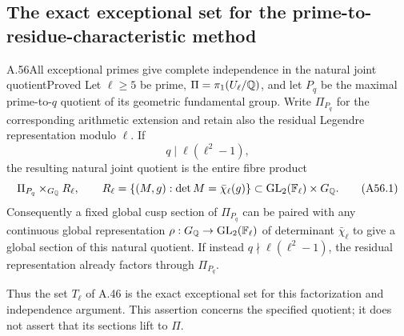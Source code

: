 \subsection{The exact exceptional set for the prime-to-residue-characteristic method}

\begin{statement}{A.56}{All exceptional primes give complete independence in the natural joint quotient}{Proved}
Let $\ell\ge5$ be prime, $\Pi=\pi_1(U_\ell/\mathbb Q)$, and let $P_q$ be
the maximal prime-to-$q$ quotient of its geometric fundamental group.
Write $\Pi_{P_q}$ for the corresponding arithmetic extension and retain
also the residual Legendre representation modulo $\ell$. If
\[
 q\mid\ell(\ell^2-1),
\]
the resulting natural joint quotient is the entire fibre product
\[
 \Pi_{P_q}\mathbin{\times}_{G_\mathbb Q} R_\ell,
 \qquad
 R_\ell=\{(M,g):\det M=\bar\chi_\ell(g)\}
       \subset\mathrm{GL}_2(\mathbb F_\ell)\times G_\mathbb Q.
 \tag{A56.1}
\]
Consequently a fixed global cusp section of $\Pi_{P_q}$ can be paired
with any continuous global representation
$\rho:G_\mathbb Q\to\mathrm{GL}_2(\mathbb F_\ell)$ of determinant $\bar\chi_\ell$
to give a global section of this natural quotient. If instead
$q\nmid\ell(\ell^2-1)$, the residual representation already factors
through $\Pi_{P_q}$.

Thus the set $T_\ell$ of A.46 is the exact exceptional set for this
factorization and independence argument. This assertion concerns the
specified quotient; it does not assert that its sections lift to $\Pi$.
\end{statement}
